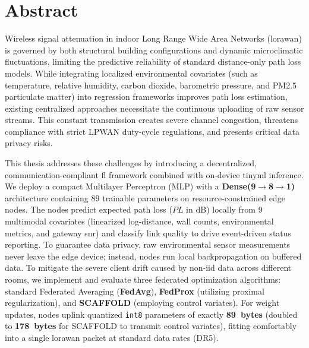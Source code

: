 \chapter*{Abstract}

Wireless signal attenuation in indoor Long Range Wide Area Networks (\gls{lorawan}) is governed by both structural building configurations and dynamic microclimatic fluctuations, limiting the predictive reliability of standard distance-only path loss models. While integrating localized environmental covariates (such as temperature, relative humidity, carbon dioxide, barometric pressure, and PM2.5 particulate matter) into regression frameworks improves path loss estimation, existing centralized approaches necessitate the continuous uploading of raw sensor streams. This constant transmission creates severe channel congestion, threatens compliance with strict LPWAN duty-cycle regulations, and presents critical data privacy risks.

This thesis addresses these challenges by introducing a decentralized, communication-compliant \gls{fl} framework combined with on-device \gls{tinyml} inference. We deploy a compact Multilayer Perceptron (MLP) with a \textbf{Dense(9$\to$8$\to$1)} architecture containing $89$ trainable parameters on resource-constrained edge nodes. The nodes predict expected path loss ($PL$ in dB) locally from 9 multimodal covariates (linearized log-distance, wall counts, environmental metrics, and gateway \gls{snr}) and classify link quality to drive event-driven status reporting. To guarantee data privacy, raw environmental sensor measurements never leave the edge device; instead, nodes run local backpropagation on buffered data. To mitigate the severe client drift caused by non-\gls{iid} data across different rooms, we implement and evaluate three federated optimization algorithms: standard Federated Averaging (\textbf{FedAvg}), \textbf{FedProx} (utilizing proximal regularization), and \textbf{SCAFFOLD} (employing control variates). For weight updates, nodes uplink quantized \texttt{int8} parameters of exactly \textbf{89~bytes} (doubled to \textbf{178~bytes} for SCAFFOLD to transmit control variates), fitting comfortably into a single \gls{lorawan} packet at standard data rates (DR5).

